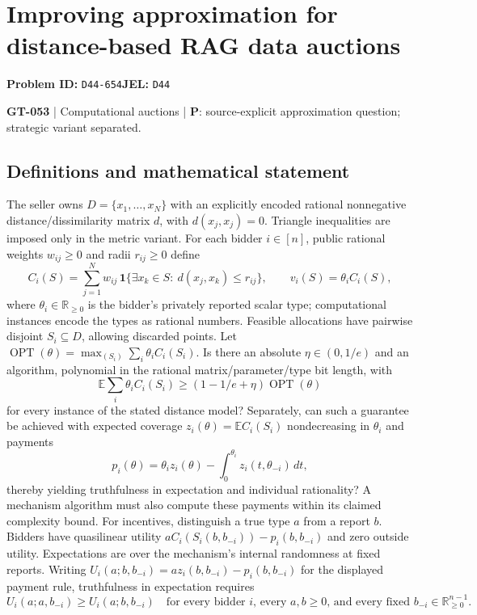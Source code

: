 \documentclass[11pt,a4paper]{article}
\begin{document}
\section*{Improving approximation for distance-based RAG data auctions}
\textbf{Problem ID:} \texttt{D44-654}\quad \textbf{JEL:} \texttt{D44}\par
\label{problem:OP-0183}
\label{game:GT-053}
{\sffamily\small\color{muted}
\textbf{GT-053} | Computational auctions | \textbf{P}: source-explicit approximation question; strategic variant separated.
\par}
\subsection*{Definitions and mathematical statement}
The seller owns $D=\{x_1,\ldots,x_N\}$ with an explicitly encoded rational nonnegative distance/dissimilarity matrix $d$, with $d(x_j,x_j)=0$. Triangle inequalities are imposed only in the metric variant. For each bidder $i\in[n]$, public rational weights $w_{ij}\geq0$ and radii $r_{ij}\geq0$ define
\[
 C_i(S)=\sum_{j=1}^N w_{ij}\,\mathbf1\{\exists x_k\in S:\ d(x_j,x_k)\leq r_{ij}\},
 \qquad v_i(S)=\theta_i C_i(S),
\]
where $\theta_i\in\mathbb R_{\geq0}$ is the bidder's privately reported scalar type; computational instances encode the types as rational numbers. Feasible allocations have pairwise disjoint $S_i\subseteq D$, allowing discarded points. Let $\operatorname{OPT}(\theta)=\max_{(S_i)}\sum_i\theta_i C_i(S_i)$. Is there an absolute $\eta\in(0,1/e)$ and an algorithm, polynomial in the rational matrix/parameter/type bit length, with
\[
 \mathbb E\sum_i\theta_iC_i(S_i)\geq(1-1/e+\eta)\operatorname{OPT}(\theta)
\]
for every instance of the stated distance model? Separately, can such a guarantee be achieved with expected coverage $z_i(\theta)=\mathbb E C_i(S_i)$ nondecreasing in $\theta_i$ and payments
\[
 p_i(\theta)=\theta_i z_i(\theta)-\int_0^{\theta_i}z_i(t,\theta_{-i})\,dt,
\]
thereby yielding truthfulness in expectation and individual rationality? A mechanism algorithm must also compute these payments within its claimed complexity bound.
For incentives, distinguish a true type $a$ from a report $b$. Bidders have quasilinear utility $aC_i(S_i(b,b_{-i}))-p_i(b,b_{-i})$ and zero outside utility. Expectations are over the mechanism's internal randomness at fixed reports. Writing $U_i(a;b,b_{-i})=a z_i(b,b_{-i})-p_i(b,b_{-i})$ for the displayed payment rule, truthfulness in expectation requires
\[
 U_i(a;a,b_{-i})\geq U_i(a;b,b_{-i})
 \quad\text{for every bidder $i$, every $a,b\geq0$, and every fixed $b_{-i}\in\mathbb R_{\geq0}^{n-1}$}.
\]
\end{document}
